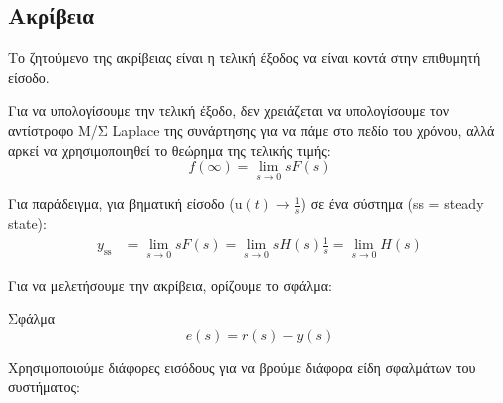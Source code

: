 \documentclass[11pt,a4paper,notitlepage,fleqn]{article}
\begin{document}
\subsection{Ακρίβεια}
Το ζητούμενο της ακρίβειας είναι η τελική έξοδος να είναι κοντά στην επιθυμητή είσοδο.

Για να υπολογίσουμε την τελική έξοδο, δεν χρειάζεται να υπολογίσουμε τον αντίστροφο Μ/Σ
Laplace της συνάρτησης για να πάμε στο πεδίο του χρόνου, αλλά αρκεί να χρησιμοποιηθεί το θεώρημα της τελικής τιμής:
\[
f(\infty) = \lim_{s\to 0} sF(s)
 \]

Για παράδειγμα, για βηματική είσοδο (\( \mathrm u(t) \rightarrow \frac{1}{s}\))
σε ένα σύστημα (ss = steady state):
\begin{align*}
	y_{\mathrm{ss}} &= \lim_{s\to 0} sF(s) = \lim_{s\to 0} sH(s)\frac{1}{s} =
	\lim_{s\to 0} H(s)
\end{align*}

\begin{comment}
\begin{tikzpicture}
\def\h{0.6}
\def\l{1.2}
\def\ll{0.75}
\draw[->] (0,0) node[left] {$r(s)$} -- (1-0.2,0);
\begin{scope}[xshift=1cm]
\draw (0,0) circle (2mm);
\draw (0.2,0) -- ++(0.75,0);
\draw (0.2+0.75, -\h/2) rectangle ++(\l, \h) node[midway] {$G_1(s)$};
\draw (\l+0.2+0.75,0) -- (3,0);
\draw  (3, -\h/2) rectangle ++(\l, \h) node[midway] {$G_2(s)$};
\draw (3+\l,0) -- (5-0.2,0);
\draw[->] (5,1) -- ++(0,-1+0.2) node[midway,right] {$d(s)$};
\draw (5,0) circle (2mm);
\draw[->] (5+0.2,0) -- ++(1,0) node[right] {$y$};
\end{scope}

\draw[->] (4.5+2.2,0) -- ++(0,-1.5) -- (4,-1.5);
\draw (4,-1.5-\h/2) rectangle ++(-\l,\h) node[midway] {$H(s)$};
\draw[->] (4-\l,-1.5) -- (1,-1.5) -- (1,-0.2);
\end{tikzpicture}
\end{comment}

Για να μελετήσουμε την ακρίβεια, ορίζουμε το σφάλμα:
\begin{defn}{Σφάλμα}{}
	\[
	e(s) = r(s) - y(s)
	\]
\end{defn}

Χρησιμοποιούμε διάφορες εισόδους για να βρούμε διάφορα είδη σφαλμάτων του συστήματος:
\end{document}
